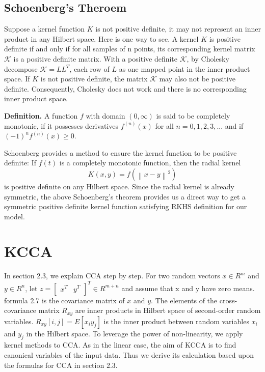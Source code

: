 \documentclass[12pt]{report} %
\newcommand{\norm}[1]{\left\lVert #1 \right\rVert}
\begin{document}
\subsection{Schoenberg's Theroem}
Suppose a kernel function $K$ is not positive definite, it may not represent an inner product in any Hilbert space. Here is one way to see. A kernel $K$ is positive definite if and only if for all samples of n points, its corresponding kernel matrix $\mathcal{K}$ is a positive definite matrix. With a positive definite $\mathcal{K}$, by Cholesky decompose $\mathcal{K}=LL^T$, each row of $L$ as one mapped point in the inner product space. If $K$ is not positive definite, the matrix $\mathcal{K}$ may also not be positive definite. Consequently, Cholesky does not work and there is no corresponding inner product space. 

\textbf{Definition.} A function $f$ with domain $(0, \infty)$ is said to be completely monotonic, if it possesses derivatives $f^{(n)}(x)$ for all $n=0,1,2,3,...$ and if $(-1)^nf^{(n)}(x) \geq 0$\cite{CMF}. 

Schoenberg\cite{Schoenberg} provides a method to ensure the kernel function to be positive definite: If \(f(t)\) is a completely monotonic function, then the radial kernel
\begin{equation}
K(x,y)=f(\norm{x-y}^2)
\end{equation}
is positive definite on any Hilbert space. Since the radial kernel is already symmetric, the above Schoenberg's theorem provides us a direct way to get a symmetric positive definite kernel function satisfying RKHS definition for our model.

\section{KCCA}
In section 2.3, we explain CCA step by step. For two random vectors $x\in R^{m}$ and $y\in R^{n}$, let $z= \begin{bmatrix}x^T & y^T\end{bmatrix}^T \in R^{m+n}$ and assume that x and y have zero means. formula 2.7 is the covariance matrix of $x$ and $y$. The elements of the cross-covariance matrix $R_{xy}$ are inner products in Hilbert space of second-order random variables. $R_{xy}[i,j]=E[x_{i}y_{j}]$ is the inner product between random variables $x_{i}$ and $y_{j}$ in the Hilbert space. To leverage the power of non-linearity, we apply kernel methods to CCA. As in the linear case, the aim of KCCA is to find canonical variables of the input data. Thus we derive its calculation based upon the formulas for CCA in section 2.3. 
\end{document}
